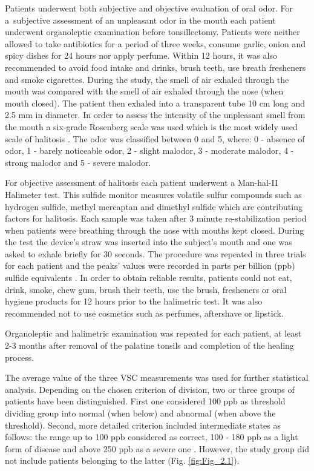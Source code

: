 \documentclass[12pt,a4paper,notitlepage]{report}
\begin{document}
Patients underwent both subjective and objective evaluation of oral odor. 
For \mbox{a subjective} assessment of an unpleasant odor in the mouth each patient underwent organoleptic examination before tonsillectomy. Patients were neither allowed to take antibiotics for a period of three weeks, consume garlic, onion and spicy dishes for 24 hours nor apply perfume. Within 12 hours, it was also recommended to avoid food intake and drinks, brush teeth, use breath fresheners and smoke cigarettes. During the study, the smell of air exhaled through the mouth was compared with the smell of air exhaled through the nose (when mouth closed). The patient then exhaled into a transparent tube 10 cm long and 2.5 mm in diameter. In order to assess the intensity of the unpleasant smell from the mouth a six-grade Rosenberg scale was used which is the most widely used scale of halitosis \cite{Rosenberg92}. The odor was classified between 0 and 5, where: 0 - absence of odor, 1 - barely noticeable odor, 2 - slight malodor, 3 - moderate malodor, 4 - strong malodor and 5 - severe malodor.\

For objective assessment of halitosis each patient underwent a Man-hal-II Halimeter test. This sulfide monitor measures volatile sulfur compounds such as hydrogen sulfide, methyl mercaptan and dimethyl sulfide which are contributing factors for halitosis. Each sample was taken after 3 minute re-stabilization period when patients were breathing through the nose with  mouths kept closed. During the test the device's straw was inserted into the subject’s mouth and one was asked to exhale briefly for 30 seconds. 
The procedure was repeated in three trials for each patient and the peaks' values were recorded in parts per billion (ppb) sulfide equivalents \cite{Alasqah16}.
In order to obtain reliable results, patients could not eat, drink, smoke, chew gum, brush their teeth, use the brush, fresheners or oral hygiene products for 12 hours prior to the halimetric test. It was also recommended not to use cosmetics such as perfumes, aftershave or lipstick. \

Organoleptic and halimetric examination was repeated for each patient, at least 2-3 months after removal of the palatine tonsils and completion of the healing process.

The average value of the three VSC measurements was used for further statistical analysis. Depending on the chosen criterion of division, two or three groups of patients have been distinguished. First one considered 100 ppb as threshold dividing group into normal (when below) and abnormal (when above the threshold). Second, more detailed criterion included intermediate states as follows: the range up to 100 ppb considered as correct, 100 - 180 ppb as a light form of disease and above 250 ppb as a severe one \cite{Lee04}. However, the study group did not include patients belonging to the latter (Fig. \ref{fig:Fig_2.1}).  
\end{document}
